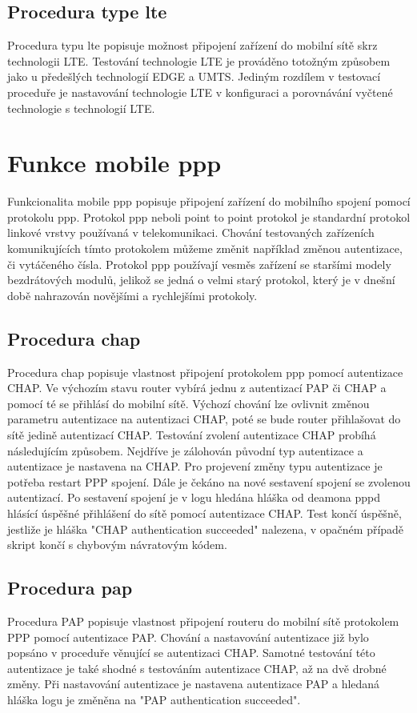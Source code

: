 \subsection{Procedura type lte}
Procedura typu lte popisuje možnost připojení zařízení do mobilní sítě skrz technologii LTE. Testování technologie LTE je prováděno totožným způsobem jako u předešlých technologií EDGE a UMTS. Jediným rozdílem v testovací proceduře je nastavování technologie LTE v konfiguraci a porovnávání vyčtené technologie s technologií LTE.

\section{Funkce mobile ppp}
Funkcionalita mobile ppp popisuje připojení zařízení do mobilního spojení pomocí protokolu ppp. Protokol ppp neboli point to point protokol je standardní protokol linkové vrstvy používaná v telekomunikaci. Chování testovaných zařízeních komunikujících tímto protokolem můžeme změnit například změnou autentizace, či vytáčeného čísla. Protokol ppp používají vesměs zařízení se staršími modely bezdrátových modulů, jelikož se jedná o velmi starý protokol, který je v dnešní době nahrazován novějšími a rychlejšími protokoly.

\subsection{Procedura chap}
Procedura chap popisuje vlastnost připojení protokolem ppp pomocí autentizace CHAP. Ve výchozím stavu router vybírá jednu z autentizací PAP či CHAP a pomocí té se přihlásí do mobilní sítě. Výchozí chování lze ovlivnit změnou parametru autentizace na autentizaci CHAP, poté se bude router přihlašovat do sítě jedině autentizací CHAP. Testování zvolení autentizace CHAP probíhá následujícím způsobem. Nejdříve je zálohován původní typ autentizace a autentizace je nastavena na CHAP. Pro projevení změny typu autentizace je potřeba restart PPP spojení. Dále je čekáno na nové sestavení spojení se zvolenou autentizací. Po sestavení spojení je v logu hledána hláška od deamona pppd hlásící úspěšné přihlášení do sítě pomocí autentizace CHAP. Test končí úspěšně, jestliže je hláška "CHAP authentication succeeded" nalezena, v opačném případě skript končí s chybovým návratovým kódem.

\subsection{Procedura pap}
Procedura PAP popisuje vlastnost připojení routeru do mobilní sítě protokolem PPP pomocí autentizace PAP. Chování a nastavování autentizace již bylo popsáno v proceduře věnující se autentizaci CHAP. Samotné testování této autentizace je také shodné s testováním autentizace CHAP, až na dvě drobné změny. Při nastavování autentizace je nastavena autentizace PAP a hledaná hláška logu je změněna na "PAP authentication succeeded".

